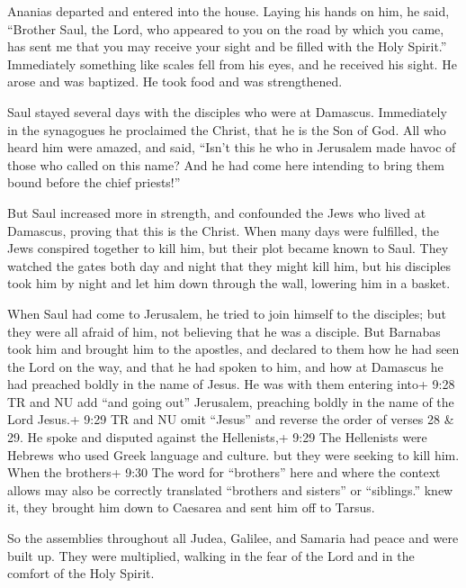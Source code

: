  Ananias departed and entered into the house. Laying his
hands on him, he said, ``Brother Saul, the Lord, who appeared to you on
the road by which you came, has sent me that you may receive your sight
and be filled with the Holy Spirit.''  Immediately
something like scales fell from his eyes, and he received his sight. He
arose and was baptized.  He took food and was strengthened.

Saul stayed several days with the disciples who were at Damascus.
 Immediately in the synagogues he proclaimed the Christ,
that he is the Son of God.  All who heard him were amazed,
and said, ``Isn't this he who in Jerusalem made havoc of those who
called on this name? And he had come here intending to bring them bound
before the chief priests!''

 But Saul increased more in strength, and confounded the
Jews who lived at Damascus, proving that this is the Christ.
 When many days were fulfilled, the Jews conspired together
to kill him,  but their plot became known to Saul. They
watched the gates both day and night that they might kill him,
 but his disciples took him by night and let him down
through the wall, lowering him in a basket.

 When Saul had come to Jerusalem, he tried to join himself
to the disciples; but they were all afraid of him, not believing that he
was a disciple.  But Barnabas took him and brought him to
the apostles, and declared to them how he had seen the Lord on the way,
and that he had spoken to him, and how at Damascus he had preached
boldly in the name of Jesus.  He was with them entering
into+ 9:28 TR and NU add ``and going out'' Jerusalem, 
preaching boldly in the name of the Lord Jesus.+ 9:29 TR and NU omit
``Jesus'' and reverse the order of verses 28 \& 29. He spoke and
disputed against the Hellenists,+ 9:29 The Hellenists were Hebrews who
used Greek language and culture. but they were seeking to kill him.
 When the brothers+ 9:30 The word for ``brothers'' here and
where the context allows may also be correctly translated ``brothers and
sisters'' or ``siblings.'' knew it, they brought him down to Caesarea
and sent him off to Tarsus.

 So the assemblies throughout all Judea, Galilee, and
Samaria had peace and were built up. They were multiplied, walking in
the fear of the Lord and in the comfort of the Holy Spirit.

